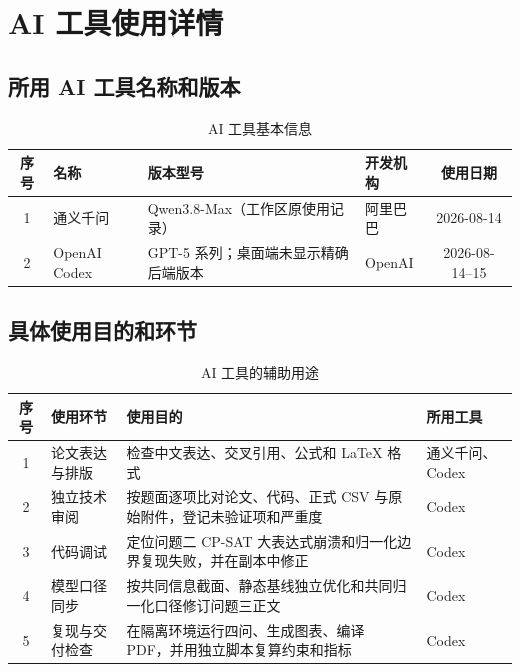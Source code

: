 \section{AI 工具使用详情}

\subsection*{所用 AI 工具名称和版本}
\begin{table}[H]
\centering
\caption{AI 工具基本信息}
\begin{tabular}{clp{}lc}
\toprule
序号 & 名称 & 版本型号 & 开发机构 & 使用日期 \\
\midrule
1 & 通义千问 & Qwen3.8-Max（工作区原使用记录） & 阿里巴巴 & 2026-08-14 \\
2 & OpenAI Codex & GPT-5 系列；桌面端未显示精确后端版本 & OpenAI & 2026-08-14--15 \\
\bottomrule
\end{tabular}
\end{table}

\subsection*{具体使用目的和环节}
\begin{table}[H]
\centering
\caption{AI 工具的辅助用途}
\begin{tabularx}{\textwidth}{cp{}Xp{}}
\toprule
序号 & 使用环节 & 使用目的 & 所用工具 \\
\midrule
1 & 论文表达与排版 & 检查中文表达、交叉引用、公式和 LaTeX 格式 & 通义千问、Codex \\
2 & 独立技术审阅 & 按题面逐项比对论文、代码、正式 CSV 与原始附件，登记未验证项和严重度 & Codex \\
3 & 代码调试 & 定位问题二 CP-SAT 大表达式崩溃和归一化边界复现失败，并在副本中修正 & Codex \\
4 & 模型口径同步 & 按共同信息截面、静态基线独立优化和共同归一化口径修订问题三正文 & Codex \\
5 & 复现与交付检查 & 在隔离环境运行四问、生成图表、编译 PDF，并用独立脚本复算约束和指标 & Codex \\
\bottomrule
\end{tabularx}
\end{table}

